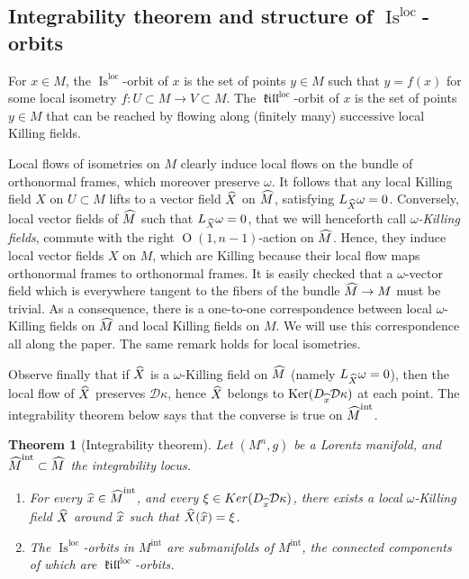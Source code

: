 \documentclass[11pt]{article}
\newtheorem{theo}{Theorem}[section]
\theoremstyle{definition}
\numberwithin{equation}{section}
\numberwithin{figure}{section}
\numberwithin{table}{section}
\DeclareMathOperator{\Ker}{Ker}
\DeclareMathOperator{\Omp}{O}%
\DeclareMathOperator{\Is}{Is}
\DeclareMathOperator{\loc}{loc}
\newcommand{\mint}{{M^{\intl}}}
\newcommand{\hmint}{{{\hat M}^{\intl}}}
\DeclareMathOperator{\intl}{int}
\DeclareMathOperator{\kil}{{\mathfrak{kill}}}
\newcommand{\kiloc}{\kil^{\loc}}
\newcommand*\dk{{\mathcal{D}\kappa}}
\newcommand{\hm}{{\hat{M}}}
\newcommand{\hx}{{\hat{x}}}
\let\oldhat\hat
\renewcommand*\hat[1]{\mathchoice{\widehat{#1}}{\widehat{#1}}{\widehat{#1}}{\oldhat{#1}}}
\begin{document}
\subsection{Integrability theorem and structure of \texorpdfstring{$\Is^{\loc}$}{Isloc}-orbits}
\label{sec.integration}


For $x \in M$, the $\Is^{\loc}$-orbit of $x$ is the set of points $y \in M$ such that $y=f(x)$ for some local isometry $f:U\subset M \to V \subset M$. The $\kiloc$-orbit of $x$ is the set of points $y \in M$ that can be reached by flowing along (finitely many) successive local Killing fields.

Local flows of isometries on $M$ clearly induce local flows on the bundle of orthonormal frames, which moreover preserve $\omega$. It follows that any local Killing field $X$ on $U \subset M$ lifts to a vector field $\hat{X}$ on $\hm$, satisfying $L_{\hat{X}}\omega=0$. Conversely, local vector fields of $\hm$ such that $L_{\hat{X}}\omega=0$, that we will henceforth call \emph{$\omega$-Killing fields}, commute with the right $\Omp(1,n-1)$-action on $\hm$. Hence, they induce local vector fields $X$ on $M$, which are Killing because their local flow maps orthonormal frames to orthonormal frames. It is easily checked that a $\omega$-vector field which is everywhere tangent to the fibers of the bundle $\hm \to M$ must be trivial. As a consequence, there is a one-to-one correspondence between local $\omega$-Killing fields on $\hm$ and local Killing fields on $M$. We will use this correspondence all along the paper. The same remark holds for local isometries.


Observe finally that if $\hat{X}$ is a $\omega$-Killing field on $\hm$ (namely $L_{\hat{X}} \omega=0$), then the local flow of $\hat{X}$ preserves $\dk$, hence $\hat{X}$ belongs to $\Ker(D_{\hx}\dk)$ at each point. The integrability theorem below says that the converse is true on $\hmint$.


\begin{theo}[Integrability theorem]\label{thm.integrabilite}
Let $(M^n,g)$ be a Lorentz manifold, and $\hmint \subset \hm$ the integrability locus.
\begin{enumerate}
\item \label{list3.1.1}For every $\hx \in \hmint$, and every $\xi \in Ker(D_{\hx}\dk)$, there exists a local $\omega$-Killing field $\hat{X}$ around $\hx$ such that $\hat{X}(\hx)=\xi$.
\item \label{list3.1.2}The $\Is^{\loc}$-orbits in $\mint$ are submanifolds of $\mint$, the connected components of which are $\kiloc$-orbits.
\end{enumerate}
\end{theo}
\end{document}
